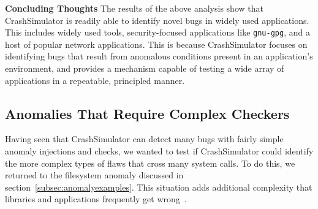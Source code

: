 {\bf Concluding Thoughts}
The results of the above analysis show that CrashSimulator is readily able to
identify novel bugs in widely used applications.  This includes
widely used tools, security-focused applications like {\tt gnu-gpg}, and 
a host of popular network applications.  This is
because CrashSimulator focuses on identifying bugs that result from anomalous
conditions present in an application's environment, and provides
a mechanism capable of testing a wide array of applications in a
repeatable, principled manner.



\subsection{Anomalies That Require Complex Checkers}
\label{sec-complex}


Having seen that CrashSimulator can detect many bugs with fairly 
simple anomaly injections and checks,
we wanted to test if CrashSimulator could identify the more complex types
of flaws that cross many system calls.
To do this, we returned to
the filesystem anomaly discussed in
section~\ref{subsec:anomalyexamples}.  This situation adds additional complexity that libraries and applications
frequently get wrong~\cite{PHPRenameBug,PythonShutilBug,NodejsCopyBug}.

